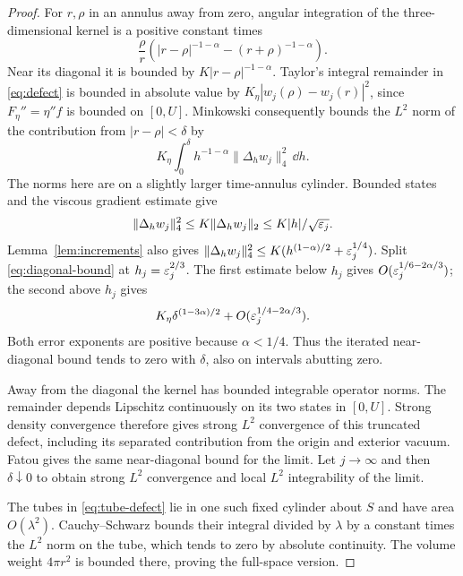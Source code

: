 \begin{proof}
For $r,\rho$ in an annulus away from zero, angular integration of the
three-dimensional kernel is a positive constant times
\[
 \frac\rho r\left(|r-\rho|^{-1-\alpha}-(r+\rho)^{-1-\alpha}\right).
\]
Near its diagonal it is bounded by $K|r-\rho|^{-1-\alpha}$.
Taylor's integral remainder in \eqref{eq:defect} is bounded in absolute
value by $K_\eta|w_j(\rho)-w_j(r)|^2$, since
$F_\eta''=\eta''f$ is bounded on $[0,U]$.
Minkowski consequently bounds the $L^2$ norm of the contribution from
$|r-\rho|<\delta$ by
\begin{equation}\label{eq:diagonal-bound}
 K_\eta\int_0^\delta h^{-1-\alpha}\|\Delta_hw_j\|_4^2\,\dd h.
\end{equation}
The norms here are on a slightly larger time-annulus cylinder.
Bounded states and the viscous gradient estimate give
\[
 \|\Delta_hw_j\|_4^2\leq K\|\Delta_hw_j\|_2
 \leq K|h|/\sqrt{\varepsilon_j}.
\]
Lemma~\ref{lem:increments} also gives
$\|\Delta_hw_j\|_4^2\leq K(h^{(1-\alpha)/2}+\varepsilon_j^{1/4})$.
Split \eqref{eq:diagonal-bound} at $h_j=\varepsilon_j^{2/3}$.
The first estimate below $h_j$ gives
$O(\varepsilon_j^{1/6-2\alpha/3})$; the second above $h_j$ gives
\[
 K_\eta\delta^{(1-3\alpha)/2}
       +O(\varepsilon_j^{1/4-2\alpha/3}).
\]
Both error exponents are positive because $\alpha<1/4$.
Thus the iterated near-diagonal bound tends to zero with $\delta$,
also on intervals abutting zero.

Away from the diagonal the kernel has bounded integrable operator norms.
The remainder depends Lipschitz continuously on its two states in
$[0,U]$. Strong density convergence therefore gives strong $L^2$
convergence of this truncated defect, including its separated contribution
from the origin and exterior vacuum. Fatou gives the same near-diagonal
bound for the limit. Let $j\to\infty$ and then $\delta\downarrow0$ to
obtain strong $L^2$ convergence and local $L^2$ integrability of the limit.

The tubes in \eqref{eq:tube-defect} lie in one such fixed cylinder about
$S$ and have area $O(\lambda^2)$. Cauchy--Schwarz bounds their integral
divided by $\lambda$ by a constant times the $L^2$ norm on the tube,
which tends to zero by absolute continuity. The volume weight $4\pi r^2$
is bounded there, proving the full-space version.
\end{proof}

